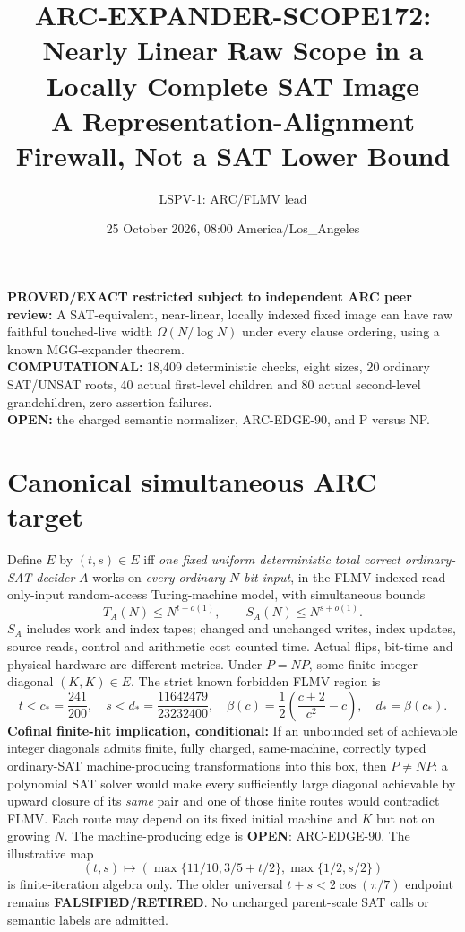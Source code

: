 \documentclass[11pt]{article}
\title{ARC-EXPANDER-SCOPE172: Nearly Linear Raw Scope in a Locally Complete SAT Image\\ \large A Representation-Alignment Firewall, Not a SAT Lower Bound}
\author{LSPV-1: ARC/FLMV lead}
\date{25 October 2026, 08:00 America/Los\_Angeles}
\begin{document}
\maketitle
\begin{center}
\textbf{PROVED/EXACT restricted subject to independent ARC peer review:} A SAT-equivalent, near-linear, locally indexed fixed image can have raw faithful touched-live width $\Omega(N/\log N)$ under every clause ordering, using a known MGG-expander theorem.\\
\textbf{COMPUTATIONAL:} 18,409 deterministic checks, eight sizes, 20 ordinary SAT/UNSAT roots, 40 actual first-level children and 80 actual second-level grandchildren, zero assertion failures.\\
\textbf{OPEN:} the charged semantic normalizer, ARC-EDGE-90, and P versus NP.
\end{center}

\section*{Canonical simultaneous ARC target}
Define $E$ by $(t,s)\in E$ iff \emph{one fixed uniform deterministic total correct ordinary-SAT decider} $A$ works on \emph{every ordinary $N$-bit input}, in the FLMV indexed read-only-input random-access Turing-machine model, with simultaneous bounds
\[
T_A(N)\le N^{t+o(1)},\qquad S_A(N)\le N^{s+o(1)}.
\]
$S_A$ includes work and index tapes; changed and unchanged writes, index updates, source reads, control and arithmetic cost counted time. Actual flips, bit-time and physical hardware are different metrics. Under $P=NP$, some finite integer diagonal $(K,K)\in E$. The strict known forbidden FLMV region is
\[
t<c_*=\frac{241}{200},\quad s<d_*=\frac{11642479}{23232400},\quad
\beta(c)=\frac12\left(\frac{c+2}{c^2}-c\right),\quad d_*=\beta(c_*).
\]
\textbf{Cofinal finite-hit implication, conditional:} If an unbounded set of achievable integer diagonals admits finite, fully charged, same-machine, correctly typed ordinary-SAT machine-producing transformations into this box, then $P\ne NP$: a polynomial SAT solver would make every sufficiently large diagonal achievable by upward closure of its \emph{same} pair and one of those finite routes would contradict FLMV. Each route may depend on its fixed initial machine and $K$ but not on growing $N$. The machine-producing edge is \textbf{OPEN}: ARC-EDGE-90. The illustrative map
\[
(t,s)\mapsto(\max\{11/10,3/5+t/2\},\max\{1/2,s/2\})
\]
is finite-iteration algebra only. The older universal $t+s<2\cos(\pi/7)$ endpoint remains \textbf{FALSIFIED/RETIRED}. No uncharged parent-scale SAT calls or semantic labels are admitted.
\end{document}
